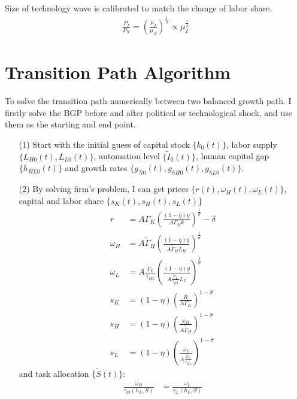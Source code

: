 \documentclass[12pt]{article}
\begin{document}
\begin{appendices}
Size of technology wave is calibrated to match the change of labor share. 
\begin{align*}
\frac{P_I}{P_N} =(\frac{\mu_I}{\mu_N})^{\frac{1}{\lambda}} \propto \mu_I^{\frac{1}{\lambda}}
\end{align*}

\section{Transition Path Algorithm}

To solve the transition path numerically between two balanced growth path. I firstly solve the BGP before and after political or technological shock, and use them as the starting and end point. 

\begin{itemize}
\item[(1)] Start with the initial guess of capital stock $\{k_0(t)\}$, labor supply $\{L_{H0}(t), L_{L0}(t)\}$, automation level $\{\tilde{I}_0(t)\}$, human capital gap $\{h_{HL0}(t)\}$ and growth rates $\{g_{N0}(t),g_{hH0}(t),g_{hL0}(t)\}$. 


\item[(2)] By solving firm's problem, I can get prices $\{r(t),\omega_H(t),\omega_L(t)\}$, capital and labor share $\{s_K(t),s_H(t),s_L(t)\}$
\begin{align*}
r &= A \Gamma_K(\frac{(1-\eta)y}{A\Gamma_Kk})^{\frac{1}{\hat{\sigma}}}-\delta \\
\omega_H &= A \tilde{\Gamma}_H(\frac{(1-\eta)y}{A\tilde{\Gamma}_HL_H})^{\frac{1}{\hat{\sigma}}} \\
\omega_L &= A \frac{\tilde{\Gamma}_L}{\gamma_{HL}}(\frac{(1-\eta)y}{A\frac{\tilde{\Gamma}_L}{\gamma_{HL}}L_L})^{\frac{1}{\hat{\sigma}}} \\
s_K &= (1-\eta)(\frac{R}{A\Gamma_K})^{1-\hat{\sigma}} \\
s_H &= (1-\eta)(\frac{\omega_H}{A \tilde{\Gamma}_H})^{1-\hat{\sigma}} \\
s_L &= (1-\eta)(\frac{\omega_L}{A \frac{\tilde{\Gamma}_L}{\gamma_{HL}}})^{1-\hat{\sigma}} 
\end{align*}
and task allocation $\{\tilde{S}(t)\}$: 
\begin{align*}
\frac{\omega_H}{\gamma_H(h_L,S)} &= \frac{\omega_L}{\gamma_L(h_L,S)}
\end{align*}


\end{itemize}
\end{appendices}
\end{document}
